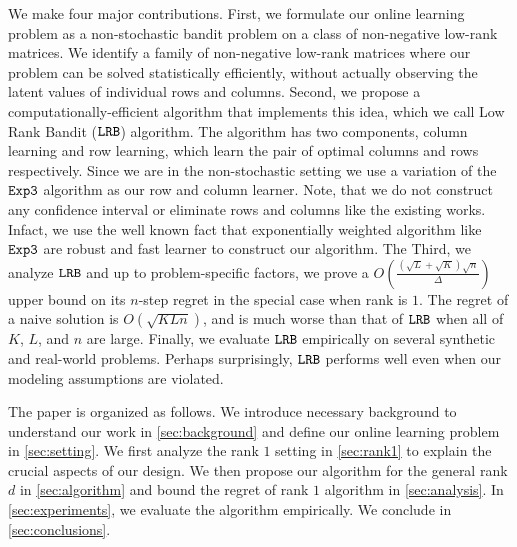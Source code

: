 
We make four major contributions. First, we formulate our online learning problem as a non-stochastic bandit problem on a class of non-negative low-rank matrices. We identify a family of non-negative low-rank matrices where our problem can be solved statistically efficiently, without actually observing the latent values of individual rows and columns. Second, we propose a computationally-efficient algorithm that implements this idea, which we call Low Rank Bandit (${\tt LRB}$) algorithm. The algorithm has two components, column learning and row learning, which learn the pair  of optimal columns and rows respectively. Since we are in the non-stochastic setting we use a variation of the ${\tt Exp3}$ \citep{auer2002nonstochastic} algorithm as our row and column learner. Note, that we do not construct any confidence interval or eliminate rows and columns like the existing works. Infact, we use the well known fact that exponentially weighted algorithm like ${\tt Exp3}$ are robust and fast learner to construct our algorithm. The Third, we analyze ${\tt LRB}$ and up to problem-specific factors, we prove a $O\left(\frac{\left(\sqrt{L } + \sqrt{K }\right)\sqrt{n}}{\Delta}\right)$ upper bound on its $n$-step regret in the special case when rank is $1$. The regret of a naive solution is $O(\sqrt{K L n})$, and is much worse than that of ${\tt LRB}$ when all of $K$, $L$, and $n$ are large. Finally, we evaluate ${\tt LRB}$ empirically on several synthetic and real-world problems. Perhaps surprisingly, ${\tt LRB}$ performs well even when our modeling assumptions are violated.

The paper is organized as follows. We introduce necessary background to understand our work in \cref{sec:background} and define our online learning problem in \cref{sec:setting}. We first analyze the rank $1$ setting in \cref{sec:rank1} to explain the crucial aspects of our design. We then propose our algorithm for the general rank $d$ in \cref{sec:algorithm} and bound the regret of rank $1$ algorithm in \cref{sec:analysis}. In \cref{sec:experiments}, we evaluate the algorithm empirically. We conclude in \cref{sec:conclusions}. 

